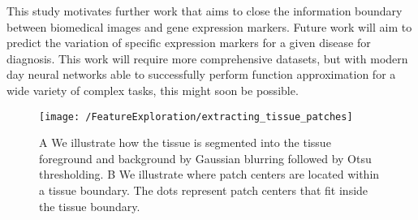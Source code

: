 \documentclass{article}
\begin{document}
This study motivates further work that aims to close the information boundary between biomedical images and gene expression markers. Future work will aim to predict the variation of specific expression markers for a given disease for diagnosis. This work will require more comprehensive datasets, but with modern day neural networks able to successfully perform function approximation for a wide variety of complex tasks, this might soon be possible.


\begin{figure}[h]
  \centering
    \texttt{[image: /FeatureExploration/extracting\_tissue\_patches]} 
  \caption{\textcolor{ao(english)}{A} We illustrate how the tissue is segmented into the tissue foreground and background by Gaussian blurring followed by Otsu thresholding. \textcolor{ao(english)}{B} We illustrate where patch centers are located within a tissue boundary. The dots represent patch centers that fit inside the tissue boundary.}
  \label{fig:extracting_tissue_patches}
\end{figure}
\end{document}
